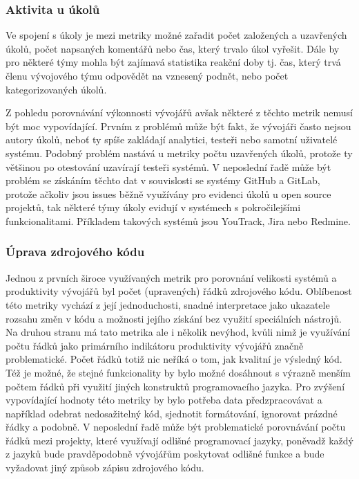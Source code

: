 \subsubsection{Aktivita u úkolů}
Ve spojení s úkoly je mezi metriky možné zařadit počet založených a uzavřených úkolů, počet napsaných komentářů nebo čas, který trvalo úkol vyřešit. Dále by pro některé týmy mohla být zajímavá statistika reakční doby tj. čas, který trvá členu vývojového týmu odpovědět na vznesený podnět, nebo počet kategorizovaných úkolů.

Z pohledu porovnávání výkonnosti vývojářů avšak některé z těchto metrik nemusí být moc vypovídající. Prvním z problémů může být fakt, že vývojáři často nejsou autory úkolů, neboť ty spíše zakládají analytici, testeři nebo samotní uživatelé systému. Podobný problém nastává u metriky počtu uzavřených úkolů, protože ty většinou po otestování uzavírají testeři systémů. \cite{issue-reporters, issue-tracking} V neposlední řadě může být problém se získáním těchto dat v souvislosti se systémy GitHub a GitLab, protože ačkoliv jsou issues běžně využívány pro evidenci úkolů u open source projektů, tak některé týmy úkoly evidují v systémech s pokročilejšími funkcionalitami. Příkladem takových systémů jsou YouTrack, Jira nebo Redmine. \cite{YouTrack, Jira, Redmine}

\subsubsection{Úprava zdrojového kódu}
Jednou z prvních široce využívaných metrik pro porovnání velikosti systémů a produktivity vývojářů byl počet (upravených) řádků zdrojového kódu. Oblíbenost této metriky vychází z její jednoduchosti, snadné interpretace jako ukazatele rozsahu změn v kódu a možnosti jejího získání bez využití speciálních nástrojů. Na druhou stranu má tato metrika ale i několik nevýhod, kvůli nimž je využívání počtu řádků jako primárního indikátoru produktivity vývojářů značně problematické. Počet řádků totiž nic neříká o tom, jak kvalitní je výsledný kód. Též je možné, že stejné funkcionality by bylo možné dosáhnout s výrazně menším počtem řádků při využití jiných konstruktů programovacího jazyka. Pro zvýšení vypovídající hodnoty této metriky by bylo potřeba data předzpracovávat a například odebrat nedosažitelný kód, sjednotit formátování, ignorovat prázdné řádky a podobně. V neposlední řadě může být problematické porovnávání počtu řádků mezi projekty, které využívají odlišné programovací jazyky, poněvadž každý z jazyků bude pravděpodobně vývojářům poskytovat odlišné funkce a bude vyžadovat jiný způsob zápisu zdrojového kódu. \cite{LOC-parareda}

